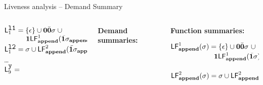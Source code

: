 \documentclass[xcolor=x11names,compress,mathserif]{beamer}
\renewcommand{\(}{\begin{columns}}
\renewcommand{\)}{\end{columns}}
\newcommand{\<}[1]{\begin{column}{#1}}
\renewcommand{\>}{\end{column}}
\begin{document}
\begin{frame}{Liveness analysis -- Demand Summary}
\begin{columns}[c]
\begin{column}[T]{0.40\textwidth}
\bigskip

$\mathsf{L}_{{1}}^{\mbox{\tt l1}} = \{\epsilon\} \cup  \mathbf{0}\bar{\mathbf{0}}\sigma\; \cup $\\
$\;\;\;\;\;\;\;\;\;\;\;\mathbf{1}\mathsf{LF}_{\mathit {\mathbf{append}}}^{1}( {\mathit {\bar{\mathbf{1}}}\sigma_{\mathbf{append}}})$\\
$\mathsf{L}_{{1}}^{\mbox{\tt l2}} = \sigma \cup \mathsf{LF}_{\mathit {\mathbf{append}}}^{2}( {\mathit {\bar{\mathbf{1}}}\sigma_{\mathbf{append}}})$\\
\ldots\\
$\mathsf{L}_{{9}}^{\mbox{\tt y}}  = $  \\


 \end{column}
 \begin{column}[T]{0.30\textwidth}
\scriptsize
\centerline{\bf Demand summaries:}
 \end{column}
 \begin{column}[T]{0.38\textwidth}
\scriptsize
\centerline{\bf Function summaries:}
\bigskip
$\mathsf{LF}_{\mathit {\mathbf{append}}}^{1}( {\mathit \sigma}) = \{\epsilon\} \cup \mathbf{0}\bar{\mathbf{0}}\sigma ~
\cup$ \\ 
$ \;\;\;\;\;\;\;\;\;\;\;\;\;\;\;\;\;\;\;\;\;\;\mathbf{1}\mathsf{LF}_{\mathit {\mathbf{append}}}^{1}( {\mathit {\bar{\mathbf{1}}}\sigma})$\\ \ \\
$\mathsf{LF}_{\mathit {\mathbf{append}}}^{2}( {\mathit \sigma}) = \sigma \cup \mathsf{LF}_{\mathit {\mathbf{append}}}^{2}( {\mathit {\bar{\mathbf{1}}}\sigma})$
 \end{column}
\end{columns}
\end{frame}



\end{document}
